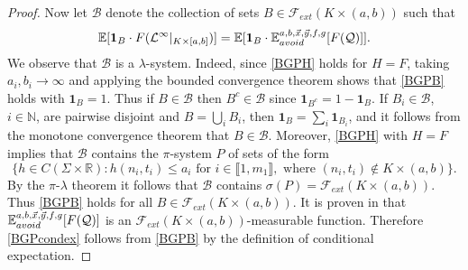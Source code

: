 \begin{proof}
	Now let $\mathcal{B}$ denote the collection of sets $B\in\mathcal{F}_{ext}(K\times(a,b))$ such that
	\begin{equation}\label{BGPB}
		\mathbb{E}[\mathbf{1}_B \cdot F(\mathcal{L}^\infty|_{K\times[a,b]})] = \mathbb{E}[\mathbf{1}_B \cdot \mathbb{E}^{a,b,\vec{x},\vec{y},f,g}_{avoid}[F(\mathcal{Q})]].
	\end{equation}
	We observe that $\mathcal{B}$ is a $\lambda$-system. Indeed, since \eqref{BGPH} holds for $H=F$, taking $a_i,b_i\to\infty$ and applying the bounded convergence theorem shows that \eqref{BGPB} holds with $\mathbf{1}_B = 1$. Thus if $B\in\mathcal{B}$ then $B^c\in\mathcal{B}$ since $\mathbf{1}_{B^c} = 1-\mathbf{1}_B$. If $B_i\in\mathcal{B}$, $i\in\mathbb{N}$, are pairwise disjoint and $B=\bigcup_i B_i$, then $\mathbf{1}_B = \sum_i \mathbf{1}_{B_i}$, and it follows from the monotone convergence theorem that $B\in\mathcal{B}$. Moreover, \eqref{BGPH} with $H=F$ implies that $\mathcal{B}$ contains the $\pi$-system $P$ of sets of the form
	\[
	\{h\in C(\Sigma\times\mathbb{R}) : h(n_i,t_i) \leq a_i \mbox{ for } i \in\llbracket 1,m_1\rrbracket, \mbox{ where } (n_i,t_i)\notin K\times(a,b)\}.
	\]
	By the $\pi$-$\lambda$ theorem \cite[Theorem 2.1.6]{Durrett} it follows that $\mathcal{B}$ contains $\sigma(P) = \mathcal{F}_{ext}(K\times(a,b))$. Thus \eqref{BGPB} holds for all $B\in\mathcal{F}_{ext}(K\times(a,b))$. It is proven in \cite[Lemma 3.4]{DimMat} that $\mathbb{E}^{a,b,\vec{x},\vec{y},f,g}_{avoid}[F(\mathcal{Q})]$ is an $\mathcal{F}_{ext}(K\times(a,b))$-measurable function. Therefore \eqref{BGPcondex} follows from \eqref{BGPB} by the definition of conditional expectation.
	
\end{proof}

